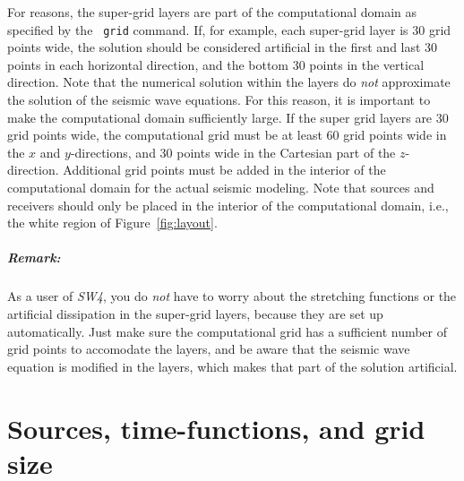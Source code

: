 \documentclass[11pt]{report}
\begin{document}
For reasons, the super-grid layers are part of the computational domain as specified by the {\tt
  grid} command. If, for example, each super-grid layer is 30 grid points wide, the solution should
be considered artificial in the first and last 30 points in each horizontal direction, and the
bottom 30 points in the vertical direction. Note that the numerical solution within the layers do
{\em not} approximate the solution of the seismic wave equations. For this reason, it is important
to make the computational domain sufficiently large. If the super grid layers are 30 grid points
wide, the computational grid must be at least 60 grid points wide in the $x$ and $y$-directions, and
30 points wide in the Cartesian part of the $z$-direction. Additional grid points must be added in
the interior of the computational domain for the actual seismic modeling. Note that sources and
receivers should only be placed in the interior of the computational domain, i.e., the white region
of Figure~\ref{fig:layout}.

\paragraph{Remark:} As a user of \emph{SW4}, you do {\em not} have to worry about the 
stretching functions or the artificial dissipation in the super-grid layers, because they are set up
automatically. Just make sure the computational grid has a sufficient number of grid points to
accomodate the layers, and be aware that the seismic wave equation is modified in the layers,
which makes that part of the solution artificial.

\chapter{Sources, time-functions, and grid size}

\end{document}
